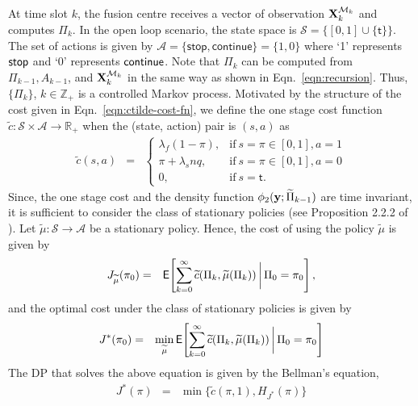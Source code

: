\documentclass[journal]{IEEEtran}
\newcommand{\EXP}[1]{\mathsf{E}\!\left[#1\right]}
\begin{document}
At time slot $k$, the fusion centre receives a vector of observation
${\bf X}_k^{{\cal M}_k}$ and computes $\Pi_k$. In the open loop
scenario, the state space is $\mathcal{S} =
\big\{[0,1]\cup\{\mathsf{t}\}\big\}$.  The set of actions is given by
$\mathcal{A} = \{\mathsf{stop},\mathsf{continue}\} =  \{1,0\}$  where
`1' represents ${\sf stop}$ and `0' represents ${\sf continue}$. Note that
$\Pi_k$ can be computed from $\Pi_{k-1}, A_{k-1}$, and ${\bf X}_k^{{\cal
M}_k}$ in the same way as shown in Eqn.~\ref{eqn:recursion}. Thus,
$\{\Pi_k\}$, $k \in \mathbb{Z}_+$ is a controlled Markov process.
Motivated by the structure of the cost given in
Eqn.~\ref{eqn:ctilde-cost-fn}, we define the 
one stage cost function
$\widetilde{c}:\mathcal{S}\times\mathcal{A}\to\mathbb{R}_+$ 
when the (state, action)
pair is $(s, a)$ as
\begin{eqnarray*}
\widetilde c(s,a) & = & \left\{
                  \begin{array}{ll}
                  \lambda_f(1-\pi),   & \text{if} \ s=\pi \in [0,1], a = 1\\
                  \pi + \lambda_s nq, & \text{if} \ s=\pi \in [0,1], a = 0\\
                  0,                  & \text{if} \ s = \mathsf{t}.
                  \end{array}
               \right.  
\end{eqnarray*}
Since, the one stage cost and the density function 
$\phi_2({\bf y};\widetilde{\Pi}_{k-1})$ are time invariant, it is sufficient
to consider the class of stationary policies (see Proposition 2.2.2 of
\cite{books.bertsekas07b}). Let $\widetilde\mu:\mathcal{S}\to\mathcal{A}$ be a
stationary policy. Hence, the cost of using the policy $\widetilde\mu$ is given by 
\begin{eqnarray*}
J_{\widetilde\mu}(\pi_0) & = &  \EXP{\sum_{k=0}^\infty \widetilde c(\Pi_k,\widetilde\mu(\Pi_k)) \bigg\arrowvert \Pi_0 = \pi_0},
\end{eqnarray*}
and the optimal cost under the class of stationary policies is given by 
\begin{eqnarray*}
J^*(\pi_0) & = & \min_{\widetilde\mu} \EXP{\sum_{k=0}^\infty \widetilde c(\Pi_k,\widetilde\mu(\Pi_k))
\bigg\arrowvert \Pi_0 = \pi_0} 
\end{eqnarray*}
The DP that solves the above equation is given by the Bellman's
equation,
\begin{eqnarray*}
J^*(\pi) & = & \min \bigg\{\widetilde c(\pi,1), H_{J^*}(\pi) \bigg\}
\end{eqnarray*}
\end{document}
